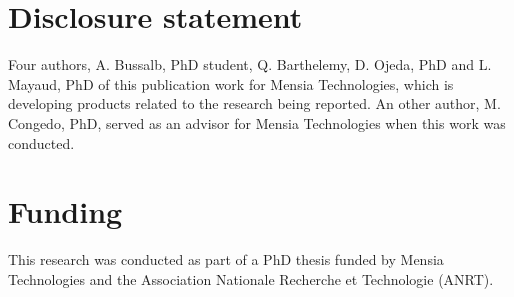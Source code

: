 
\section{Disclosure statement}

Four authors, A. Bussalb, PhD student, Q. Barthelemy, D. Ojeda, PhD and L. Mayaud, PhD of this publication work for Mensia Technologies, which is developing products related to the research being reported.
An other author, M. Congedo, PhD, served as an advisor for Mensia Technologies when this work was conducted. 

\section{Funding}
This research was conducted as part of a PhD thesis funded by Mensia Technologies and the Association Nationale Recherche et Technologie (ANRT).